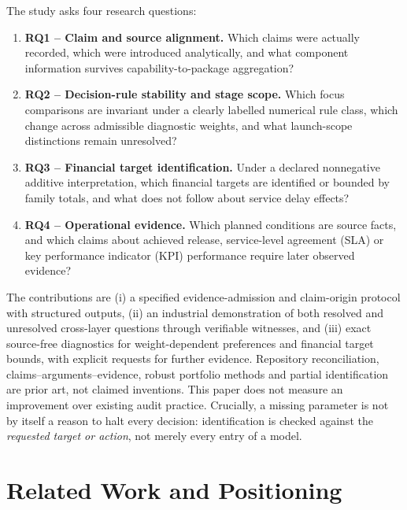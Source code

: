 \documentclass[systems,article,submit,moreauthors]{Definitions/mdpi}
\begin{document}
The study asks four research questions:
\begin{enumerate}[leftmargin=1.5em]
\item \textbf{RQ1 -- Claim and source alignment.} Which claims were actually recorded, which were introduced analytically, and what component information survives capability-to-package aggregation?
\item \textbf{RQ2 -- Decision-rule stability and stage scope.} Which focus comparisons are invariant under a clearly labelled numerical rule class, which change across admissible diagnostic weights, and what launch-scope distinctions remain unresolved?
\item \textbf{RQ3 -- Financial target identification.} Under a declared nonnegative additive interpretation, which financial targets are identified or bounded by family totals, and what does not follow about service delay effects?
\item \textbf{RQ4 -- Operational evidence.} Which planned conditions are source facts, and which claims about achieved release, service-level agreement (SLA) or key performance indicator (KPI) performance require later observed evidence?
\end{enumerate}

The contributions are (i) a specified evidence-admission and claim-origin protocol with structured outputs, (ii) an industrial demonstration of both resolved and unresolved cross-layer questions through verifiable witnesses, and (iii) exact source-free diagnostics for weight-dependent preferences and financial target bounds, with explicit requests for further evidence. Repository reconciliation, claims--arguments--evidence, robust portfolio methods and partial identification are prior art, not claimed inventions. This paper does not measure an improvement over existing audit practice. Crucially, a missing parameter is not by itself a reason to halt every decision: identification is checked against the \emph{requested target or action}, not merely every entry of a model.

\section{Related Work and Positioning}
\end{document}
